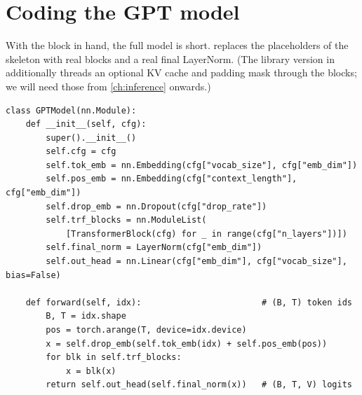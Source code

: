 \section{Coding the GPT model}\label{sec:gpt:model}

With the block in hand, the full model is short.  replaces the placeholders of
the skeleton with real blocks and a real final LayerNorm. (The library version in
 additionally threads an optional KV cache and padding mask through the
blocks; we will need those from \cref{ch:inference} onwards.)

\begin{lstlisting}[caption={The complete GPT model.},label={lst:gpt:model}]
class GPTModel(nn.Module):
    def __init__(self, cfg):
        super().__init__()
        self.cfg = cfg
        self.tok_emb = nn.Embedding(cfg["vocab_size"], cfg["emb_dim"])
        self.pos_emb = nn.Embedding(cfg["context_length"], cfg["emb_dim"])
        self.drop_emb = nn.Dropout(cfg["drop_rate"])
        self.trf_blocks = nn.ModuleList(
            [TransformerBlock(cfg) for _ in range(cfg["n_layers"])])
        self.final_norm = LayerNorm(cfg["emb_dim"])
        self.out_head = nn.Linear(cfg["emb_dim"], cfg["vocab_size"], bias=False)

    def forward(self, idx):                        # (B, T) token ids
        B, T = idx.shape
        pos = torch.arange(T, device=idx.device)
        x = self.drop_emb(self.tok_emb(idx) + self.pos_emb(pos))
        for blk in self.trf_blocks:
            x = blk(x)
        return self.out_head(self.final_norm(x))   # (B, T, V) logits
\end{lstlisting}

